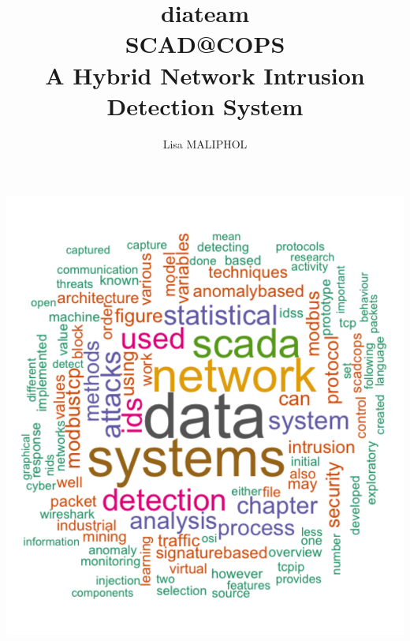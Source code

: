 \documentclass[11pt,a4paper]{article}
\title{diateam\\SCAD@COPS\\A Hybrid Network Intrusion\\Detection System}
\author{Lisa MALIPHOL}
\date{}
\begin{document}
\TBfrontcover

\thispagestyle{empty}

\newpage
\thispagestyle{empty} \mbox{}

\clearpage

\maketitle


\includegraphics{thesis_files/figure-latex/unnamed-chunk-3-1.pdf}

\thispagestyle{empty}

\newpage
\thispagestyle{empty} \mbox{}

\clearpage
{}
\end{document}
